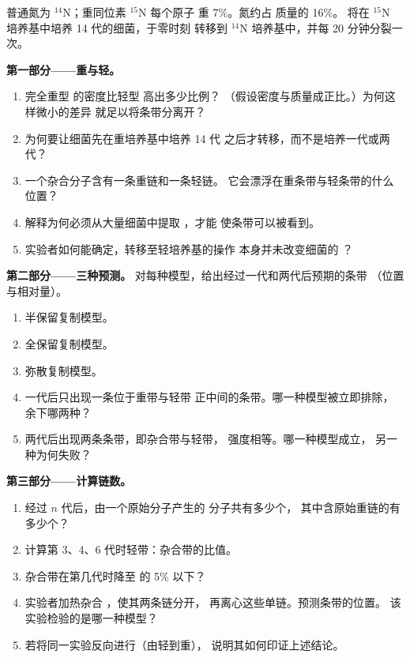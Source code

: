 \begin{problem}
\label{pb:g11:dna-replication:1}
普通氮为 $^{14}$N；重同位素 $^{15}$N 每个原子
重 7\%。氮约占  质量的 16\%。
将在 $^{15}$N 培养基中培养 14 代的细菌，于零时刻
转移到 $^{14}$N 培养基中，并每 20 分钟分裂一次。

\medskip
\noindent\textbf{第一部分——重与轻。}
\begin{enumerate}
  \item 完全重型  的密度比轻型  高出多少比例？
        （假设密度与质量成正比。）为何这样微小的差异
        就足以将条带分离开？
  \item 为何要让细菌先在重培养基中培养 14 代
        之后才转移，而不是培养一代或两代？
  \item 一个杂合分子含有一条重链和一条轻链。
        它会漂浮在重条带与轻条带的什么位置？
  \item 解释为何必须从大量细菌中提取 ，才能
        使条带可以被看到。
  \item 实验者如何能确定，转移至轻培养基的操作
        本身并未改变细菌的 ？
\end{enumerate}

\medskip
\noindent\textbf{第二部分——三种预测。}
  对每种模型，给出经过一代和两代后预期的条带
        （位置与相对量）。
\begin{enumerate}[resume]
  \item 半保留复制模型。
  \item 全保留复制模型。
  \item 弥散复制模型。
  \item 一代后只出现一条位于重带与轻带
        正中间的条带。哪一种模型被立即排除，
        余下哪两种？
  \item 两代后出现两条条带，即杂合带与轻带，
        强度相等。哪一种模型成立，
        另一种为何失败？
\end{enumerate}

\medskip
\noindent\textbf{第三部分——计算链数。}
\begin{enumerate}[resume]
  \item 经过 $n$ 代后，由一个原始分子产生的
         分子共有多少个，
        其中含原始重链的有多少个？
  \item 计算第 3、4、6 代时轻带：杂合带的比值。
  \item 杂合带在第几代时降至  的 5\%
        以下？
  \item 实验者加热杂合 ，使其两条链分开，
        再离心这些单链。预测条带的位置。
        该实验检验的是哪一种模型？
  \item 若将同一实验反向进行（由轻到重），
        说明其如何印证上述结论。
\end{enumerate}


\end{problem}
